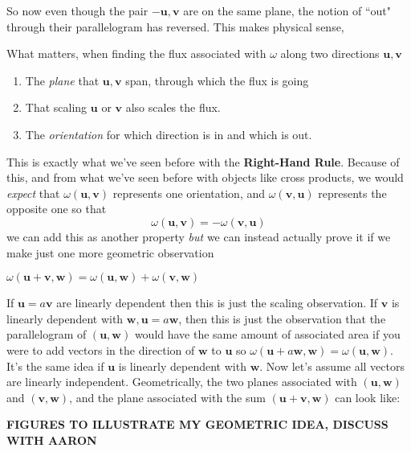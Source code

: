 	So now even though the pair $-\mathbf u, \mathbf v$ are on the same plane, the notion of ``out" through their parallelogram has reversed. This makes physical sense, 
	\begin{concept}
		What matters, when finding the flux associated with $\omega$ along two directions $\mathbf u, \mathbf v$
		\begin{enumerate}
			\item The \emph{plane} that $\mathbf u, \mathbf v$ span, through which the flux is going
			\item That scaling $\mathbf u$ or $\mathbf v$ also scales the flux.
			\item The \emph{orientation} for which direction is in and which is out.
		\end{enumerate}
	\end{concept}
	This is exactly what we've seen before with the \textbf{Right-Hand Rule}. Because of this, and from what we've seen before with objects like cross products, we would \emph{expect} that $\omega(\mathbf u, \mathbf v)$ represents one orientation, and $\omega(\mathbf v, \mathbf u)$ represents the opposite one so that 
	 \begin{equation*}
	 	\omega(\mathbf u, \mathbf v) = -\omega(\mathbf v, \mathbf u)
	 \end{equation*}
	we can add this as another property \emph{but} we can instead actually prove it if we make just one more geometric observation
	\begin{obs}
		$\omega(\mathbf u+\mathbf v, \mathbf w) = \omega(\mathbf u, \mathbf w) + \omega(\mathbf v, \mathbf w)$
	\end{obs}
	If $\mathbf u = a \mathbf v$ are linearly dependent then this is just the scaling observation. If $\mathbf v$ is linearly dependent with $\mathbf w, \mathbf u = a \mathbf w$, then this is just the observation that the parallelogram of $(\mathbf u, \mathbf w)$ would have the same amount of associated area if you were to add vectors in the direction of $\mathbf w$ to $\mathbf u$ so $\omega(\mathbf u + a \mathbf w, \mathbf w) = \omega(\mathbf u, \mathbf w)$. It's the same idea if $\mathbf u$ is linearly dependent with $\mathbf w$. Now let's assume all vectors are linearly independent. Geometrically, the two planes associated with $(\mathbf u,\mathbf w)$ and $(\mathbf v,\mathbf w)$, and the plane associated with the sum $(\mathbf u + \mathbf v, \mathbf w)$ can look like:
	
	\textbf{FIGURES TO ILLUSTRATE MY GEOMETRIC IDEA, DISCUSS WITH AARON}

